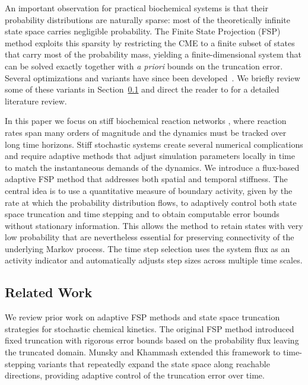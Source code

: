 \documentclass[onefignum,onetabnum]{siamart171218}
\begin{document}
An important observation for practical biochemical systems is that their probability distributions are naturally sparse: most of the theoretically infinite state space carries negligible probability. The Finite State Projection (FSP) method \cite{Munsky2006} exploits this sparsity by restricting the CME to a finite subset of states that carry most of the probability mass, yielding a finite-dimensional system that can be solved exactly together with \emph{a priori} bounds on the truncation error. Several optimizations and variants have since been developed~\cite{Kazeev2014, Vo2017, Dinh_2020,Sunkara2012, Jahnke2010, Burrage2006AKF, Sidje2015}. We briefly review some of these variants in Section~\ref{sec:related-work} and direct the reader to \cite{Dinh2016} for a detailed literature review. 

In this paper we focus on stiff biochemical reaction networks \cite{Gillespie2001, CAO20083472, Wilkinson2006-so}, where reaction rates span many orders of magnitude and the dynamics must be tracked over long time horizons. Stiff stochastic systems create several numerical complications and require adaptive methods that adjust simulation parameters locally in time to match the instantaneous demands of the dynamics. We introduce a flux-based adaptive FSP method that addresses both spatial and temporal stiffness. The central idea is to use a quantitative measure of boundary activity, given by the rate at which the probability distribution flows, to adaptively control both state space truncation and time stepping and to obtain computable error bounds without stationary information. This allows the method to retain states with very low probability that are nevertheless essential for preserving connectivity of the underlying Markov process. The time step selection uses the system flux as an activity indicator and automatically adjusts step sizes across multiple time scales. 

\subsection{Related Work}
\label{sec:related-work}
We review prior work on adaptive FSP methods and state space truncation strategies for stochastic chemical kinetics. The original FSP method \cite{Munsky2006} introduced fixed truncation with rigorous error bounds based on the probability flux leaving the truncated domain. Munsky and Khammash \cite{MUNSKY2007818} extended this framework to time-stepping variants that repeatedly expand the state space along reachable directions, providing adaptive control of the truncation error over time.
\end{document}
